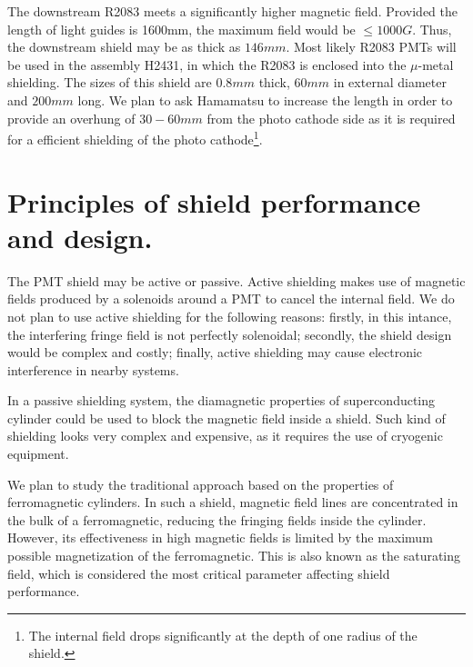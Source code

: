 \documentclass[12pt]{article}
\begin{document}
The downstream R2083 meets a significantly higher magnetic field.
Provided the  length of  light guides  is 1600mm, the maximum field would
be $\leq 1000G$. Thus, the downstream  shield may be as thick as $146mm$.
Most likely  R2083 PMTs will be used in the assembly H2431, in which the R2083 is 
enclosed into the $\mu$-metal shielding. The sizes of this shield are
$0.8mm$ thick, $60mm$ in external diameter and $200mm$ long.
We plan to ask Hamamatsu to increase the length in order to provide an overhung 
of $30-60mm$ from  the photo cathode side as it is required for a 
efficient shielding of the photo cathode\footnote{The internal field 
drops significantly at the depth of one radius of the shield.}.


\section{ Principles of shield performance and design.}

The PMT shield may be active or passive.
Active shielding makes use of  magnetic fields produced by a  solenoids  around a PMT to
cancel the internal  field. We do not plan to use active shielding for the following reasons: firstly, in this intance, the interfering fringe field is not perfectly solenoidal; secondly, the shield design would be complex and costly; finally, active shielding may cause electronic interference in nearby systems.


In a passive shielding system, the diamagnetic properties
of superconducting cylinder could be used to block the magnetic field inside a shield.
Such kind of shielding looks very complex and expensive, as it requires the use of cryogenic equipment.

We plan to study the  traditional approach  based on the  properties of 
ferromagnetic cylinders.
In such a shield, magnetic field lines are concentrated in the bulk of a
ferromagnetic, reducing the fringing fields inside the cylinder.
However, its effectiveness in high magnetic fields is limited by the
maximum possible magnetization of the ferromagnetic.
This is also known as the saturating field, which is considered the most critical parameter affecting shield performance.
\end{document}
